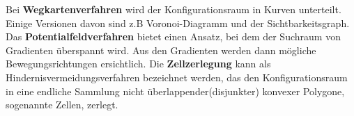Bei \textbf{Wegkartenverfahren} wird der Konfigurationsraum in Kurven unterteilt. Einige Versionen davon sind z.B Voronoi-Diagramm\cite{voronoi} und der \linebreak Sichtbarkeitsgraph\cite{visG1}. Das \textbf{Potentialfeldverfahren} bietet einen Ansatz, bei dem der Suchraum von Gradienten überspannt wird. Aus den Gradienten werden dann mögliche Bewegungsrichtungen ersichtlich. Die \textbf{Zellzerlegung}\cite{cd} kann als Hindernisvermeidungsverfahren bezeichnet werden, das den Konfigurationsraum in eine endliche Sammlung nicht überlappender(disjunkter) konvexer Polygone, sogenannte Zellen, zerlegt.
